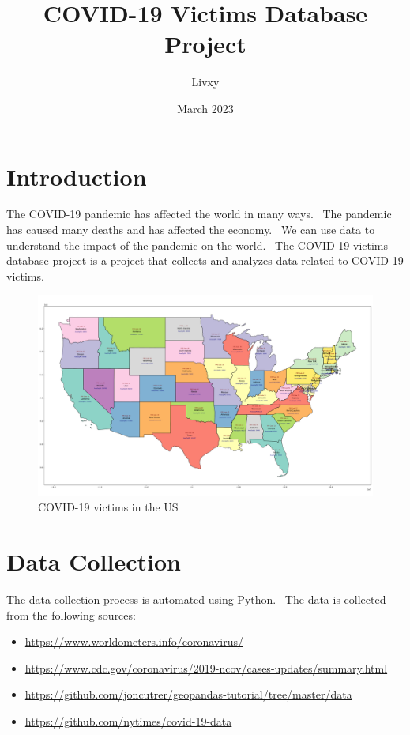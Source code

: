 \documentclass{article}
\begin{document}
\title{COVID-19 Victims Database Project}
\author{Livxy}
\date{March 2023}

\maketitle
\thispagestyle{empty}
\vspace{50cm}


\section{Introduction}
The COVID-19 pandemic has affected the world in many ways. \
The pandemic has caused many deaths and has affected the economy. \
We can use data to understand the impact of the pandemic on the world. \
The COVID-19 victims database project is a project that collects and analyzes data related to COVID-19 victims.

\begin{figure}[h]
\centering
\includegraphics[width=1\textwidth]{images/USA.png}
\caption{COVID-19 victims in the US}
\end{figure}


\section{Data Collection}
The data collection process is automated using Python. \
The data is collected from the following sources: \
\begin{itemize}
\item \url{https://www.worldometers.info/coronavirus/}
\item \url{https://www.cdc.gov/coronavirus/2019-ncov/cases-updates/summary.html}
\item \url{https://github.com/joncutrer/geopandas-tutorial/tree/master/data}
\item \url{https://github.com/nytimes/covid-19-data}
\end{itemize}
\end{document}
